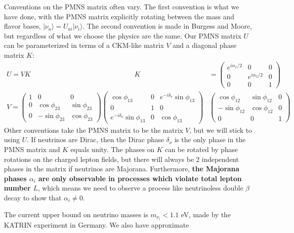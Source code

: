 \documentclass[11pt, oneside]{article}   	%
\theoremstyle{definition}
\numberwithin{equation}{subsection}		%
\begin{document}
Conventions on the PMNS matrix often vary. The first convention is what we have done, with the PMNS matrix explicitly rotating between the 
mass and flavor bases, $|\nu_a\rangle = U_{ai} |\nu_i\rangle$. The second convention is made in Burgess and Moore, but regardless of what we 
choose the physics are the same. Our PMNS matrix $U$ can be parameterized in terms of a CKM-like matrix $V$ and a diagonal phase 
matrix $K$:
\begin{align}
	U = VK \;\;\;\;\;\;\;\;\;\;\;\;\;\;\;\;\;\;\;\;\;\;\;\;\;\;\;\;\;\;\;\;\;\;\;\;\;\;\;\;\;\;\;\;\;\;\;\;\;\;\;\;\;\; K &= \begin{pmatrix} e^{i\alpha_1 / 2} & 0 & 0 \\ 0 & e^{i\alpha_2 / 2} & 0 \\ 0 & 0 & 1 \end{pmatrix} \\
	V = \begin{pmatrix} 
		1 & 0 & 0 \\ 0 & \cos\phi_{23} & \sin\phi_{23} \\ 0 & -\sin\phi_{23} & \cos\phi_{23} 
	\end{pmatrix}
	\begin{pmatrix} 
		\cos\phi_{13} & 0 & e^{-i\delta_\nu} \sin\phi_{13} \\ 0 & 1 & 0 \\ e^{-i\delta_\nu} \sin\phi_{13} & 0 & \cos\phi_{13} 
	\end{pmatrix}&
	\begin{pmatrix}
		\cos\phi_{12} & \sin\phi_{12} & 0 \\ -\sin\phi_{12} & \cos\phi_{12} & 0 \\ 0 & 0 & 1 
	\end{pmatrix}
\end{align}
Other conventions take the PMNS matrix to be the matrix $V$, but we will stick to using $U$. 
If neutrinos are Dirac, then the Dirac phase $\delta_\nu$ is the only phase in the PMNS matrix and $K$ equals unity. The phases on $K$ can be rotated by phase 
rotations on the charged lepton fields, but there will always be 2 independent phases in the matrix if neutrinos are Majorana. Furthermore, \textbf{the Majorana phases 
$\alpha_i$ are only observable in processes which violate total lepton number $L$}, which means we need to observe a process like neutrinoless double $\beta$ decay 
to show that $\alpha_i\neq 0$. 

The current upper bound on neutrino masses is $m_{\nu_i} < 1.1$ eV, made by the KATRIN experiment in Germany. We also have approximate 
\end{document}
